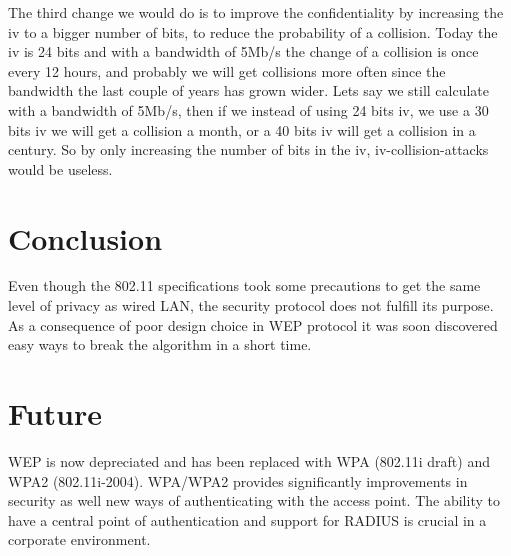 \documentclass[twocolumn,11pt]{IEEEtran}
\begin{document}
The third change we would do is to improve the confidentiality by increasing the iv to a bigger number of bits, to reduce the probability of a collision. Today the iv is 24 bits and with a bandwidth of 5Mb/s the change of a collision is once every 12 hours, and probably we will get collisions more often since the bandwidth the last couple of years has grown wider. Lets say we still calculate with a bandwidth of 5Mb/s, then if we instead of using 24 bits iv, we use a 30 bits iv we will get a collision a month, or a 40 bits iv will get a collision in a century. So by only increasing the number of bits in the iv, iv-collision-attacks would be useless.


\section {Conclusion}
\label{sec:conclusion}

Even though the 802.11 specifications took some precautions to get the same level of privacy as wired LAN, the security protocol does not fulfill its purpose. As a consequence of poor design choice in WEP protocol it was soon discovered easy ways to break the algorithm in a short time. 


\section {Future}
\label{sec:future}

WEP is now depreciated and has been replaced with WPA (802.11i draft) and WPA2 (802.11i-2004). WPA/WPA2 provides significantly improvements in security as well new ways of authenticating with the access point. The ability to have a central point  of authentication and support for RADIUS is crucial in a corporate environment.






\end{document}
